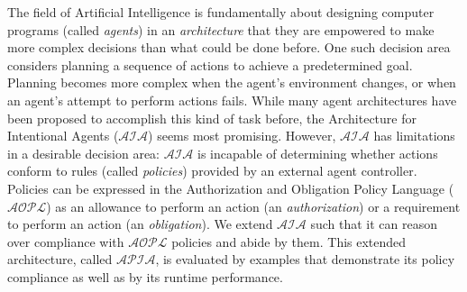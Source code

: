 
The field of Artificial Intelligence is fundamentally about designing computer programs (called \textit{agents}) in an \textit{architecture} that they are empowered to make more complex decisions than what could be done before.
One such decision area considers planning a sequence of actions to achieve a predetermined goal.
Planning becomes more complex when the agent's environment changes, or when an agent's attempt to perform actions fails.
While many agent architectures have been proposed to accomplish this kind of task before, the Architecture for Intentional Agents ($\mathcal{AIA}$) seems most promising.
However, $\mathcal{AIA}$ has limitations in a desirable decision area: $\mathcal{AIA}$ is incapable of determining whether actions conform to rules (called \textit{policies}) provided by an external agent controller.
Policies can be expressed in the Authorization and Obligation Policy Language ($\mathcal{AOPL}$) as an allowance to perform an action (an \textit{authorization}) or a requirement to perform an action (an \textit{obligation}).
We extend $\mathcal{AIA}$ such that it can reason over compliance with $\mathcal{AOPL}$ policies and abide by them.
This extended architecture, called $\mathcal{APIA}$, is evaluated by examples that demonstrate its policy compliance as well as by its runtime performance.